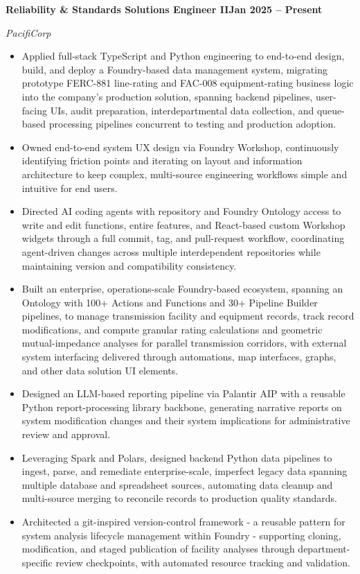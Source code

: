 \documentclass[10pt, letterpaper]{article}
\newcommand{\jobline}[2]{%
  \vspace{5pt}%
  \noindent\textbf{#1}\hfill\textbf{#2}\par%
  \vspace{1pt}%
}
\newcommand{\subline}[1]{%
  \vspace{-1pt}%
  \noindent\textit{#1}\par%
  \vspace{1pt}%
}
\newenvironment{rlist}{%
  \begin{itemize}[leftmargin=1.4em, itemsep=1pt, topsep=2pt, parsep=0pt]%
}{%
  \end{itemize}%
}
\begin{document}
\jobline{Reliability \& Standards Solutions Engineer II}{Jan 2025 -- Present}
\subline{PacifiCorp}
\begin{rlist}
  \item Applied full-stack TypeScript and Python engineering to end-to-end design, build, and deploy a Foundry-based data management system, migrating prototype FERC-881 line-rating and FAC-008 equipment-rating business logic into the company's production solution, spanning backend pipelines, user-facing UIs, audit preparation, interdepartmental data collection, and queue-based processing pipelines concurrent to testing and production adoption.
  \item Owned end-to-end system UX design via Foundry Workshop, continuously identifying friction points and iterating on layout and information architecture to keep complex, multi-source engineering workflows simple and intuitive for end users.
  \item Directed AI coding agents with repository and Foundry Ontology access to write and edit functions, entire features, and React-based custom Workshop widgets through a full commit, tag, and pull-request workflow, coordinating agent-driven changes across multiple interdependent repositories while maintaining version and compatibility consistency.
  \item Built an enterprise, operations-scale Foundry-based ecosystem, spanning an Ontology with 100+ Actions and Functions and 30+ Pipeline Builder pipelines, to manage transmission facility and equipment records, track record modifications, and compute granular rating calculations and geometric mutual-impedance analyses for parallel transmission corridors, with external system interfacing delivered through automations, map interfaces, graphs, and other data solution UI elements.
  \item Designed an LLM-based reporting pipeline via Palantir AIP with a reusable Python report-processing library backbone, generating narrative reports on system modification changes and their system implications for administrative review and approval.
  \item Leveraging Spark and Polars, designed backend Python data pipelines to ingest, parse, and remediate enterprise-scale, imperfect legacy data spanning multiple database and spreadsheet sources, automating data cleanup and multi-source merging to reconcile records to production quality standards.
  \item Architected a git-inspired version-control framework - a reusable pattern for system analysis lifecycle management within Foundry - supporting cloning, modification, and staged publication of facility analyses through department-specific review checkpoints, with automated resource tracking and validation.

\end{rlist}
\end{document}
